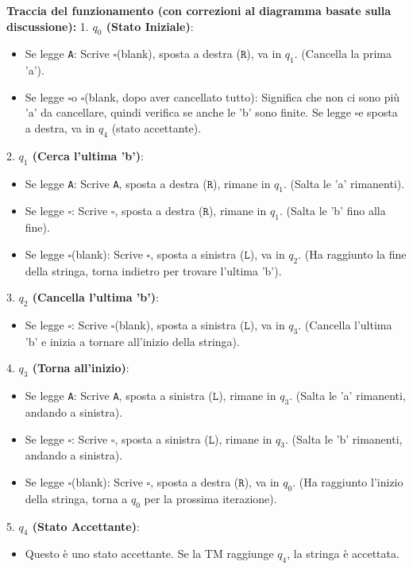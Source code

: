\documentclass[a4paper]{article}
\newcommand{\blankS}{\ensuremath{\square}}
\begin{document}
\textbf{Traccia del funzionamento (con correzioni al diagramma basate sulla discussione):}
1.  \textbf{$q_0$ (Stato Iniziale)}:
    \begin{itemize}
        \item Se legge \texttt{A}: Scrive \blankS (blank), sposta a destra ($\texttt{R}$), va in $q_1$. (Cancella la prima 'a').
        \item Se legge \blankS o \blankS (blank, dopo aver cancellato tutto): Significa che non ci sono più 'a' da cancellare, quindi verifica se anche le 'b' sono finite. Se legge \blankS e sposta a destra, va in $q_4$ (stato accettante).
    \end{itemize}
2.  \textbf{$q_1$ (Cerca l'ultima 'b')}:
    \begin{itemize}
        \item Se legge \texttt{A}: Scrive \texttt{A}, sposta a destra ($\texttt{R}$), rimane in $q_1$. (Salta le 'a' rimanenti).
        \item Se legge \blankS: Scrive \blankS, sposta a destra ($\texttt{R}$), rimane in $q_1$. (Salta le 'b' fino alla fine).
        \item Se legge \blankS (blank): Scrive \blankS, sposta a sinistra ($\texttt{L}$), va in $q_2$. (Ha raggiunto la fine della stringa, torna indietro per trovare l'ultima 'b').
    \end{itemize}
3.  \textbf{$q_2$ (Cancella l'ultima 'b')}:
    \begin{itemize}
        \item Se legge \blankS: Scrive \blankS (blank), sposta a sinistra ($\texttt{L}$), va in $q_3$. (Cancella l'ultima 'b' e inizia a tornare all'inizio della stringa).
    \end{itemize}
4.  \textbf{$q_3$ (Torna all'inizio)}:
    \begin{itemize}
        \item Se legge \texttt{A}: Scrive \texttt{A}, sposta a sinistra ($\texttt{L}$), rimane in $q_3$. (Salta le 'a' rimanenti, andando a sinistra).
        \item Se legge \blankS: Scrive \blankS, sposta a sinistra ($\texttt{L}$), rimane in $q_3$. (Salta le 'b' rimanenti, andando a sinistra).
        \item Se legge \blankS (blank): Scrive \blankS, sposta a destra ($\texttt{R}$), va in $q_0$. (Ha raggiunto l'inizio della stringa, torna a $q_0$ per la prossima iterazione).
    \end{itemize}
5.  \textbf{$q_4$ (Stato Accettante)}:
    \begin{itemize}
        \item Questo è uno stato accettante. Se la TM raggiunge $q_4$, la stringa è accettata.
    \end{itemize}
\end{document}
